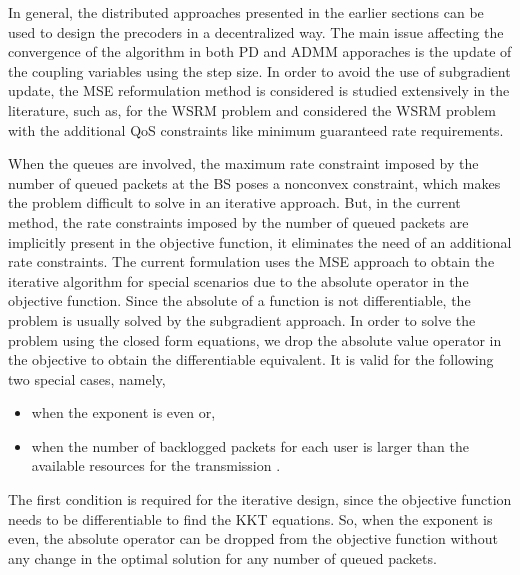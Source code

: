 
In general, the distributed approaches presented in the earlier sections can be used to design the precoders in a decentralized way. The main issue affecting the convergence of the algorithm in both \acl{PD} and \ac{ADMM} apporaches is the update of the coupling variables using the step size. In order to avoid the use of subgradient update, the \ac{MSE} reformulation method is considered is studied extensively in the literature, such as, \cite{wmmse_shi} for the \ac{WSRM} problem and \cite{kaleva2012weighted} considered the \ac{WSRM} problem with the additional \ac{QoS} constraints like minimum guaranteed rate requirements.

When the queues are involved, the maximum rate constraint imposed by the number of queued packets at the \ac{BS} poses a nonconvex constraint, which makes the problem difficult to solve in an iterative approach. But, in the current method, the rate constraints imposed by the number of queued packets are implicitly present in the objective function, it eliminates the need of an additional rate constraints. The current formulation uses the \ac{MSE} approach to obtain the iterative algorithm for special scenarios due to the absolute operator in the objective function. Since the absolute of a function is not differentiable, the problem is usually solved by the subgradient approach. In order to solve the problem using the closed form equations, we drop the absolute value operator in the objective to obtain the differentiable equivalent. It is valid for the following two special cases, namely,
\begin{itemize}
\item when the exponent  is even or,
\item when the number of backlogged packets for each user is larger than the available resources for the transmission .
\end{itemize}
The first condition is required for the iterative design, since the objective function needs to be differentiable to find the \ac{KKT} equations. So, when the exponent  is even, the absolute operator can be dropped from the objective function without any change in the optimal solution for any number of queued packets.

